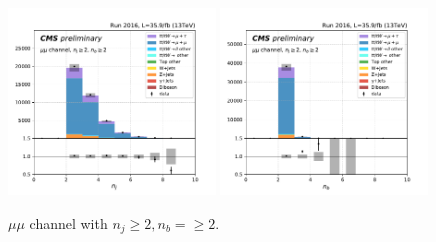 \begin{figure}[ht]
    \includegraphics[width=0.49\textwidth]{chapters/Analysis/sectionPlots/figures/kinematics_pickles/mumu/2b/mumu_2b_nJets.pdf}
    \includegraphics[width=0.49\textwidth]{chapters/Analysis/sectionPlots/figures/kinematics_pickles/mumu/2b/mumu_2b_nBJets.pdf}
    
    \caption{$\mu\mu$ channel with $n_j\geq2, n_b=\geq2$.}
\end{figure}


